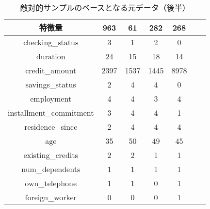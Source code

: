 \begin{table}[H]
    \centering
    \caption{敵対的サンプルのベースとなる元データ（後半）}
    \begin{tabular}{|c|c|c|c|c|c|c|}
        \hline
        特徴量 & 963 & 61 & 282 & 268 \\ \hline
        checking\_status & 3 & 1 & 2 & 0 \\ \hline
        duration & 24 & 15 & 18 & 14 \\ \hline
        credit\_amount & 2397 & 1537 & 1445 & 8978 \\ \hline
        savings\_status & 2 & 4 & 4 & 0 \\ \hline
        employment & 4 & 4 & 3 & 4 \\ \hline
        installment\_commitment & 3 & 4 & 4 & 1 \\ \hline
        residence\_since & 2 & 4 & 4 & 4 \\ \hline
        age & 35 & 50 & 49 & 45 \\ \hline
        existing\_credits & 2 & 2 & 1 & 1 \\ \hline
        num\_dependents & 1 & 1 & 1 & 1 \\ \hline
        own\_telephone & 1 & 1 & 0 & 1 \\ \hline
        foreign\_worker & 0 & 0 & 0 & 1 \\ \hline
    \end{tabular}
\end{table}




% 
% 
